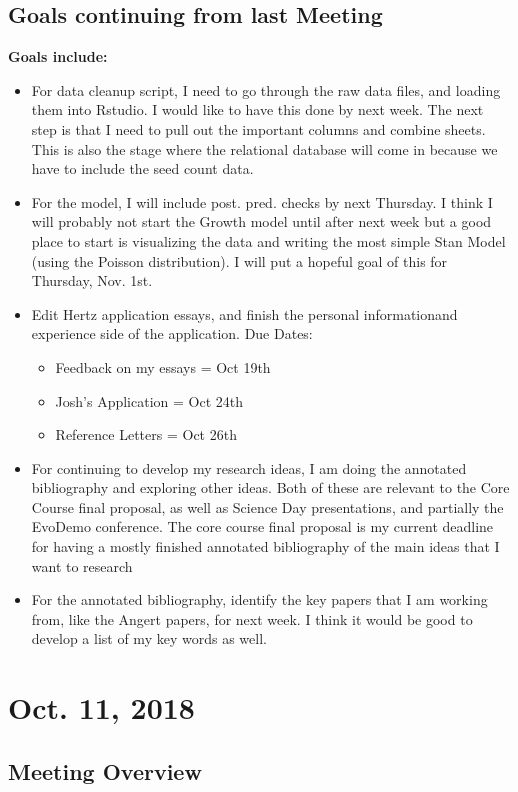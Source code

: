 \documentclass{article}
\begin{document}
\subsection*{Goals continuing from last Meeting}
\textbf{Goals include:} 
\begin{itemize}
\item{For data cleanup script, I need to go through the raw data files, and loading them into Rstudio. I would like to have this done by next week. The next step is that I need to pull out the important columns and combine sheets. This is also the stage where the relational database will come in because we have to include the seed count data.}
\item{For the model, I will include post. pred. checks by next Thursday. I think I will probably not start the Growth model until after next week but a good place to start is visualizing the data and writing the most simple Stan Model (using the Poisson distribution). I will put a hopeful goal of this for Thursday, Nov. 1st.}
\item{Edit Hertz application essays, and finish the personal informationand experience side of the application. Due Dates: \begin{itemize}
\item{Feedback on my essays = Oct 19th} 
\item{Josh's Application = Oct 24th} 
\item{Reference Letters = Oct 26th}
\end{itemize}}
\item{For continuing to develop my research ideas, I am doing the annotated bibliography and exploring other ideas. Both of these are relevant to the Core Course final proposal, as well as Science Day presentations, and partially the EvoDemo conference. The core course final proposal is my current deadline for having a mostly finished annotated bibliography of the main ideas that I want to research}
\item{For the annotated bibliography, identify the key papers that I am working from, like the Angert papers, for next week. I think it would be good to develop a list of my key words as well.}
\end{itemize}

\section*{Oct. 11, 2018}

\subsection*{Meeting Overview}
\end{document}
